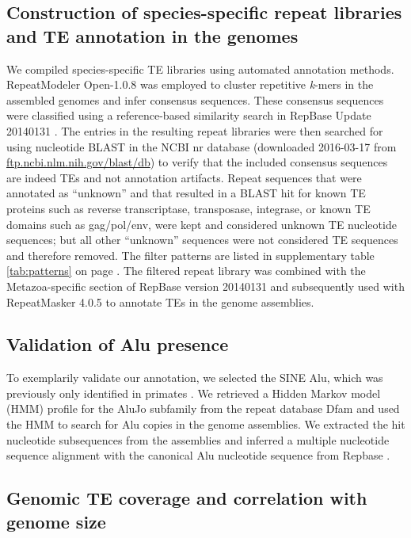 \subsection{Construction of species-specific repeat libraries and TE
annotation in the
genomes}\label{construction-of-species-specific-repeat-libraries-and-te-annotation-in-the-genomes}

We compiled species-specific TE libraries using automated annotation
methods. RepeatModeler Open-1.0.8 \citep{Smit2015} was employed to
cluster repetitive \emph{k}-mers in the assembled genomes and infer
consensus sequences. These consensus sequences were classified using a
reference-based similarity search in RepBase Update 20140131
\citep{Jurka2005}. The entries in the resulting repeat libraries were
then searched for using nucleotide BLAST in the NCBI nr database
(downloaded 2016-03-17 from
\href{ftp://ftp.ncbi.nlm.nih.gov/blast/db}{ftp.ncbi.nlm.nih.gov/blast/db})
to verify that the included consensus sequences are indeed TEs and not
annotation artifacts. Repeat sequences that were annotated as
``unknown'' and that resulted in a BLAST hit for known TE proteins such
as reverse transcriptase, transposase, integrase, or known TE domains
such as gag/pol/env, were kept and considered unknown TE nucleotide
sequences; but all other ``unknown'' sequences were not considered TE
sequences and therefore removed. The filter patterns are listed in
supplementary table \ref{tab:patterns} on page \pageref{tab:patterns}.
The filtered repeat library was combined with the Metazoa-specific
section of RepBase version 20140131 and subsequently used with
RepeatMasker 4.0.5 \citep{Smit2015a} to annotate TEs in the genome
assemblies.

\subsection{Validation of Alu
presence}\label{validation-of-alu-presence}

To exemplarily validate our annotation, we selected the SINE Alu, which
was previously only identified in primates \citep{Kriegs2007}. We
retrieved a Hidden Markov model (HMM) profile for the AluJo subfamily
from the repeat database Dfam \citep{Hubley2015} and used the HMM to
search for Alu copies in the genome assemblies. We extracted the hit
nucleotide subsequences from the assemblies and inferred a multiple
nucleotide sequence alignment with the canonical Alu nucleotide sequence
from Repbase \citep{Jurka2005}.

\subsection{Genomic TE coverage and correlation with genome
size}\label{genomic-te-coverage-and-correlation-with-genome-size}

